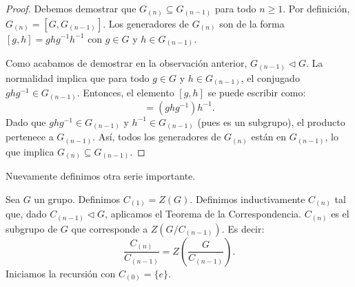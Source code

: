 \begin{proof}
    Debemos demostrar que $G_{(n)} \subseteq G_{(n-1)}$ para todo $n \ge 1$.
    Por definición, $G_{(n)} = [G, G_{(n-1)}]$.
    Los generadores de $G_{(n)}$ son de la forma $[g, h] = ghg^{-1}h^{-1}$ con $g \in G$ y $h \in G_{(n-1)}$.
    
    Como acabamos de demostrar en la observación anterior, $G_{(n-1)} \triangleleft G$.
    La normalidad implica que para todo $g \in G$ y $h \in G_{(n-1)}$, el conjugado $ghg^{-1} \in G_{(n-1)}$.
    Entonces, el elemento $[g, h]$ se puede escribir como:
    \begin{equation*}
        [g, h] = (ghg^{-1})h^{-1}.
    \end{equation*}
    Dado que $ghg^{-1} \in G_{(n-1)}$ y $h^{-1} \in G_{(n-1)}$ (pues es un subgrupo), el producto pertenece a $G_{(n-1)}$.
    Así, todos los generadores de $G_{(n)}$ están en $G_{(n-1)}$, lo que implica $G_{(n)} \subseteq G_{(n-1)}$.
\end{proof}

Nuevamente definimos otra serie importante.

\begin{defi}
    Sea $G$ un grupo. Definimos $C_{(1)} = Z(G)$. Definimos inductivamente $C_{(n)}$ tal que, dado $C_{(n-1)} \triangleleft G$, aplicamos el Teorema de la Correspondencia. $C_{(n)}$ es el subgrupo de $G$ que corresponde a $Z(G/C_{(n-1)})$. Es decir:
    \begin{equation*}
        \frac{C_{(n)}}{C_{(n-1)}} = Z\left(\frac{G}{C_{(n-1)}}\right).
    \end{equation*}
    Iniciamos la recursión con $C_{(0)} = \{e\}$.
\end{defi}


